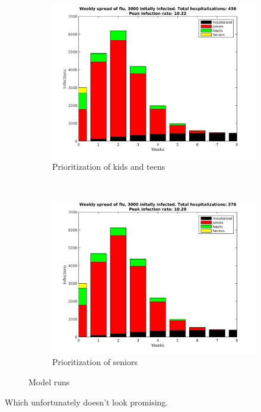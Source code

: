 \documentclass[titlepage]{article}
\begin{document}
\begin{figure}[h!]
\begin{subfigure}[b]{0.5\textwidth}
		\centering
		\includegraphics[width=\textwidth]{figures/Weekly-juniors.png}
		\caption{Prioritization of kids and teens}
	\end{subfigure}~
	\begin{subfigure}[b]{0.5\textwidth}
		\centering
		\includegraphics[width=\textwidth]{figures/Weekly-seniors.png}
		\caption{Prioritization of seniors}
	\end{subfigure}
	\caption{Model runs}
	\label{fig:modelout}
\end{figure}

Which unfortunately doesn't look promising.
\end{document}
